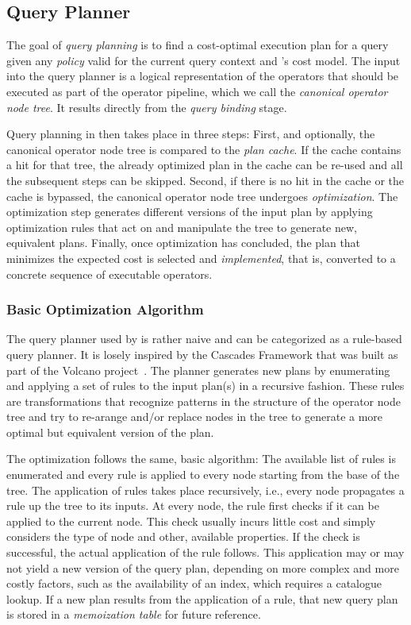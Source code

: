 \subsection{Query Planner}

The goal of \emph{query planning} is to find a cost-optimal execution plan for a query given any \emph{policy} valid for the current query context and \cottontail{}'s cost model. The input into the query planner is a logical representation of the operators that should be executed as part of the operator pipeline, which we call the \emph{canonical operator node tree}. It results directly from the \emph{query binding} stage.

Query planning in \cottontail{} then takes place in three steps: First, and optionally, the canonical operator node tree is compared to the \emph{plan cache}. If the cache contains a hit for that tree, the already optimized plan in the cache can be re-used and all the subsequent steps can be skipped. Second, if there is no hit in the cache or the cache is bypassed, the canonical operator node tree undergoes \emph{optimization}. The optimization step generates different versions of the input plan by applying optimization rules that act on and manipulate the tree to generate new, equivalent plans. Finally, once optimization has concluded, the plan that minimizes the expected cost is selected and \emph{implemented}, that is, converted to a concrete sequence of executable operators.

\subsubsection{Basic Optimization Algorithm}

The query planner used by \cottontail{} is rather naive and can be categorized as a rule-based query planner. It is losely inspired by the Cascades Framework that was built as part of the Volcano project~\cite{Graefe:1993Volcano}. The planner generates new plans by enumerating and applying a set of rules to the input plan(s) in a recursive fashion. These rules are transformations that recognize patterns in the structure of the operator node tree and try to re-arange and/or replace nodes in the tree to generate a more optimal but equivalent version of the plan.

The optimization follows the same, basic algorithm: The available list of rules is enumerated and every rule is applied to every node starting from the base of the tree. The application of rules takes place recursively, i.e., every node propagates a rule up the tree to its inputs. At every node, the rule first checks if it can be applied to the current node. This check usually incurs little cost and simply considers the type of node and other, available properties. If the check is successful, the actual application of the rule follows. This application may or may not yield a new version of the query plan, depending on more complex and more costly factors, such as the availability of an index, which requires a catalogue lookup. If a new plan results from the application of a rule, that new query plan is stored in a \emph{memoization table} for future reference. 

